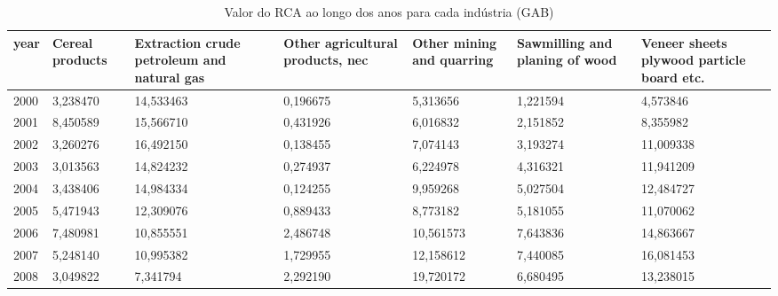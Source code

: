 \begin{table}
\centering
\caption{Valor do RCA ao longo dos anos para cada indústria (GAB)}
\begin{tabular}{p{1cm}p{2cm}p{2cm}p{2cm}p{2cm}p{2cm}p{2cm}}
\toprule
 year &  Cereal products &  Extraction crude petroleum and natural gas &  Other agricultural products, nec &  Other mining and quarring &  Sawmilling and planing of wood &  Veneer sheets plywood particle board etc. \\
\midrule
 2000 &         3,238470 &                                   14,533463 &                          0,196675 &                   5,313656 &                        1,221594 &                                   4,573846 \\
 2001 &         8,450589 &                                   15,566710 &                          0,431926 &                   6,016832 &                        2,151852 &                                   8,355982 \\
 2002 &         3,260276 &                                   16,492150 &                          0,138455 &                   7,074143 &                        3,193274 &                                  11,009338 \\
 2003 &         3,013563 &                                   14,824232 &                          0,274937 &                   6,224978 &                        4,316321 &                                  11,941209 \\
 2004 &         3,438406 &                                   14,984334 &                          0,124255 &                   9,959268 &                        5,027504 &                                  12,484727 \\
 2005 &         5,471943 &                                   12,309076 &                          0,889433 &                   8,773182 &                        5,181055 &                                  11,070062 \\
 2006 &         7,480981 &                                   10,855551 &                          2,486748 &                  10,561573 &                        7,643836 &                                  14,863667 \\
 2007 &         5,248140 &                                   10,995382 &                          1,729955 &                  12,158612 &                        7,440085 &                                  16,081453 \\
 2008 &         3,049822 &                                    7,341794 &                          2,292190 &                  19,720172 &                        6,680495 &                                  13,238015 \\

\end{tabular}
\end{table}

